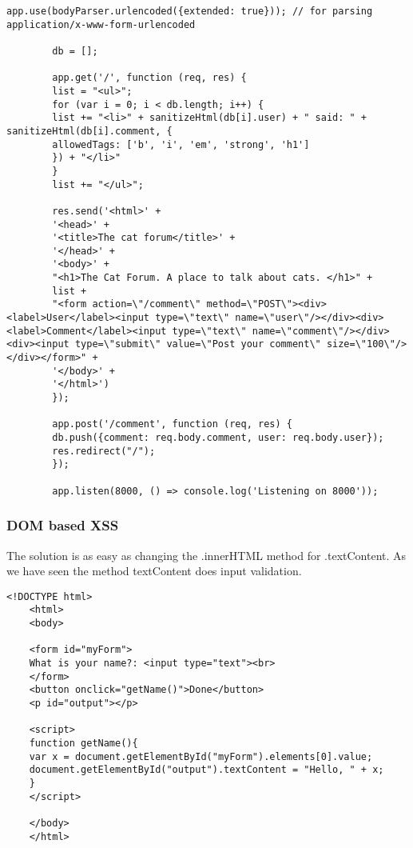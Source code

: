 \begin{Answer}[ref={websec-xss-prevention}]
\begin{lstlisting}[style=JavaScript]
		app.use(bodyParser.urlencoded({extended: true})); // for parsing application/x-www-form-urlencoded
		
		db = [];
		
		app.get('/', function (req, res) {
		list = "<ul>";
		for (var i = 0; i < db.length; i++) {
		list += "<li>" + sanitizeHtml(db[i].user) + " said: " + sanitizeHtml(db[i].comment, {
		allowedTags: ['b', 'i', 'em', 'strong', 'h1']
		}) + "</li>"
		}
		list += "</ul>";
		
		res.send('<html>' +
		'<head>' +
		'<title>The cat forum</title>' +
		'</head>' +
		'<body>' +
		"<h1>The Cat Forum. A place to talk about cats. </h1>" +
		list +
		"<form action=\"/comment\" method=\"POST\"><div><label>User</label><input type=\"text\" name=\"user\"/></div><div><label>Comment</label><input type=\"text\" name=\"comment\"/></div><div><input type=\"submit\" value=\"Post your comment\" size=\"100\"/></div></form>" +
		'</body>' +
		'</html>')
		});
		
		app.post('/comment', function (req, res) {
		db.push({comment: req.body.comment, user: req.body.user});
		res.redirect("/");
		});
		
		app.listen(8000, () => console.log('Listening on 8000'));
		\end{lstlisting}
	\subsubsection{DOM based XSS}
	The solution is as easy as changing the .innerHTML method for .textContent. As we have seen the method textContent does input validation.
	\begin{lstlisting}[style=JavaScript]<!DOCTYPE html>
	<html>
	<body>
	
	<form id="myForm">
	What is your name?: <input type="text"><br>
	</form>
	<button onclick="getName()">Done</button>
	<p id="output"></p>
	
	<script>
	function getName(){
	var x = document.getElementById("myForm").elements[0].value;
	document.getElementById("output").textContent = "Hello, " + x;
	}
	</script>
	
	</body>
	</html>
	\end{lstlisting}
\end{Answer}